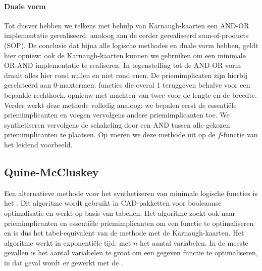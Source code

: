 \paragraph{Duale vorm}
Tot dusver hebben we telkens met behulp van Karnaugh-kaarten een AND-OR implementatie gerealiseerd: analoog aan de eerder gerealiseerd sum-of-products (SOP). De conclusie dat bijna alle logische methodes en duale vorm hebben, geldt hier opniew: ook de Karnaugh-kaarten kunnen we gebruiken om een minimale OR-AND implementatie te realiseren. In tegenstelling tot de AND-OR vorm draait alles hier rond nullen en niet rond enen. De priemimplicaten zijn hierbij gerelateerd aan $0$-maxtermen: functies die overal $1$ teruggeven behalve voor een bepaalde rechthoek, opnieuw met machten van twee voor de lengte en de breedte. Verder werkt deze methode volledig analoog: we bepalen eerst de essenti\"ele priemimplicanten en voegen vervolgens andere priemimplicanten toe. We synthetiseren vervolgens de schakeling door een AND tussen alle gekozen priemimplicanten te plaatsen. Op  voeren we deze methode uit op de $f$-functie van het leidend voorbeeld.


\subsection{Quine-McCluskey}
Een alternatieve methode voor het synthetiseren van minimale logische functies is het . Dit algoritme wordt gebruikt in CAD-pakketten voor booleaanse optimalisatie en werkt op basis van tabellen. Het algoritme zoekt ook naar priemimplicanten en essenti\"ele priemimplicanten om een functie te optimaliseren en is dus het tabel-equivalent van de methode met de Karnaugh-kaarten. Het algoritme werkt in exponenti\"ele tijd:  met $n$ het aantal variabelen. In de meeste gevallen is het aantal variabelen te groot om een gegeven functie te optimaliseren, in dat geval wordt er gewerkt met de .

